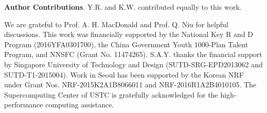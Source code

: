 \documentclass[journal=nalefd,manuscript=communication]{achemso}
\begin{document}
\textbf{Author Contributions}. Y.R. and K.W. contributed equally to this work.

\begin{acknowledgement}
We are grateful to Prof. A. H. MacDonald and Prof. Q. Niu for helpful discussions. This work was financially supported by the National Key R and D Program (2016YFA0301700), the China Government Youth 1000-Plan Talent Program, and NNSFC (Grant No. 11474265). S.A.Y. thanks the financial support by Singapore University of Technology and Design (SUTD-SRG-EPD2013062 and SUTD-T1-2015004). Work in Seoul has been supported by the Korean NRF under Grant Nos. NRF-2015K2A1B8066011 and NRF-2016R1A2B4010105. The Supercomputing Center of USTC is gratefully acknowledged for the high-performance computing assistance.
\end{acknowledgement}
\end{document}
